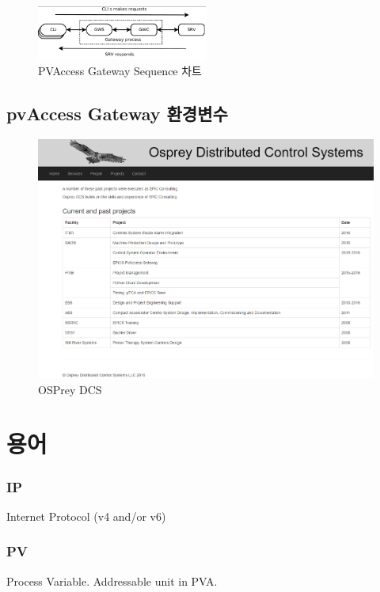 \documentclass[11pt
  , a4paper
  , article
  , oneside
]{memoir}
\begin{document}
\begin{figure}[!htb]
	\centering
	\includegraphics[width=0.5\textwidth, height=0.2\textheight]{./images/connections.png}
	\caption{
		PVAccess Gateway Sequence 차트
	}
	\label{fig:connections}   
\end{figure}

\subsection{pvAccess Gateway 환경변수}

\begin{figure}[!htb]
	\centering
	\includegraphics[width=1\textwidth, height=0.6\textheight]{./images/osprey_dcs.png}
	\caption{
		OSPrey DCS
	}
	\label{fig:osprey}   
\end{figure}


\clearpage



\section{용어}
\subsubsection{IP}
Internet Protocol (v4 and/or v6)

\subsubsection{PV}
Process Variable. Addressable unit in PVA.
\end{document}
